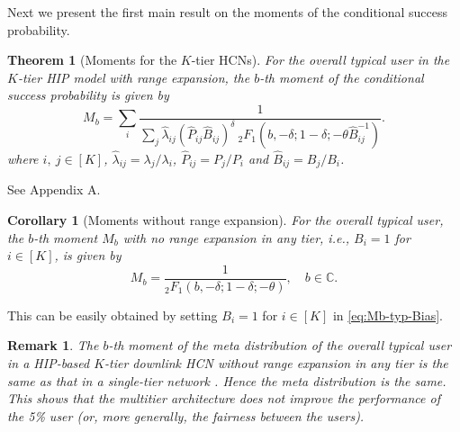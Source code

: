 \documentclass[12pt,draftclsnofoot,journal,onecolumn]{IEEEtran}
\def\P{\mathbb{P}}
\def\ie{{\em i.e.}}
\def\eqa{\stackrel{{\rm (a)}}{=}}
\newtheorem{theorem}{Theorem}
\newtheorem{corollary}{Corollary}
\newtheorem{remark}{Remark}
\begin{document}
%	
Next we present the first main result on the moments of the conditional success probability.
\begin{theorem}[Moments for the $K$-tier HCNs]
	\label{thm:Mb_RE}
	For the overall typical user in the $K$-tier HIP model with range expansion, the $b$-th moment of the conditional success probability is given by
	\begin{equation}
	\label{eq:Mb-typ-Bias}
	M_b = \sum\limits_{i} \frac{1}{\sum\limits_{j}\hat\lambda_{ij} (\hat P_{ij} \hat B_{ij})^\delta~ _2F_1(b,-\delta; 1-\delta; -\theta\hat B_{ij}^{-1})}.
	\end{equation}
	where $i,~j\in[K]$, $\hat\lambda_{ij} = \lambda_j/\lambda_i$, $\hat P_{ij} = P_j/P_i$ and $\hat B_{ij} = B_j/B_i$.
\end{theorem}
\begin{IEEEproof}
	See Appendix A.
\end{IEEEproof}

\begin{corollary}[Moments without range expansion]
	\label{thm:Mb-WO-RE}
	For the overall typical user, the $b$-th moment $M_b$ with no range expansion in any tier, \ie, $B_i=1$ for $i\in[K]$, is given by
	\begin{equation}\label{eq:Mb_typ}
	M_b=\frac{1}{_2F_1(b,-\delta; 1-\delta; -\theta)} ,\quad b\in \mathbb{C}.
	\end{equation}
\end{corollary}
\begin{IEEEproof}
This can be easily obtained by setting $B_i=1$ for $i\in[K]$ in \eqref{eq:Mb-typ-Bias}.
\end{IEEEproof} 
\begin{remark}
The $b$-th moment of the meta distribution of the overall typical user in a HIP-based $K$-tier downlink HCN without range expansion in any tier is the same as that in a single-tier network \cite[Thm.~2]{MHmeta}. Hence the meta distribution is the same. This shows that the multitier architecture does not improve the performance of the 5\% user (or, more generally, the fairness between the users).
\end{remark}
\end{document}
